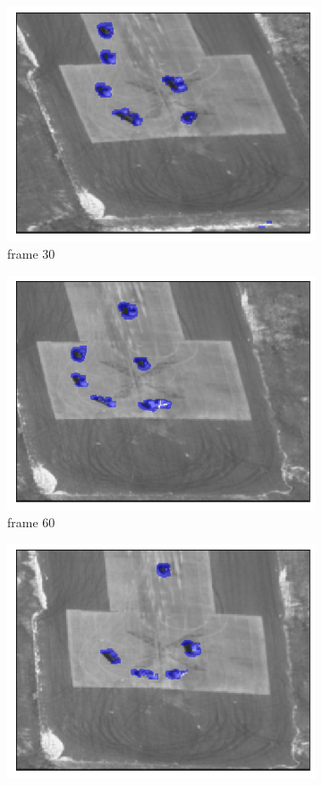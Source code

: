 \documentclass[11pt]{article}
\begin{document}
\begin{figure}[h!]
    \begin{subfigure}{.24\textwidth}
      \centering
      \includegraphics[width=.8\linewidth]{../results/aerialseq_29.png}
      \caption{frame 30}
    \end{subfigure}
    \begin{subfigure}{.24\textwidth}
      \centering
      \includegraphics[width=.8\linewidth]{../results/aerialseq_59.png}
      \caption{frame 60}
    \end{subfigure}
    \begin{subfigure}{.24\textwidth}
      \centering
      \includegraphics[width=.8\linewidth]{../results/aerialseq_89.png}

\end{subfigure}
\end{figure}
\end{document}

